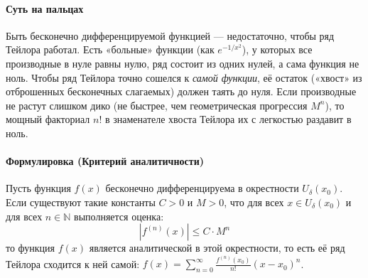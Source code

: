 \paragraph{Суть на пальцах}
Быть бесконечно дифференцируемой функцией — недостаточно, чтобы ряд Тейлора работал. Есть «больные» функции (как $e^{-1/x^2}$), у которых все производные в нуле равны нулю, ряд состоит из одних нулей, а сама функция не ноль. Чтобы ряд Тейлора точно сошелся к \textit{самой функции}, её остаток («хвост» из отброшенных бесконечных слагаемых) должен таять до нуля. Если производные не растут слишком дико (не быстрее, чем геометрическая прогрессия $M^n$), то мощный факториал $n!$ в знаменателе хвоста Тейлора их с легкостью раздавит в ноль.

\paragraph{Формулировка (Критерий аналитичности)}
Пусть функция $f(x)$ бесконечно дифференцируема в окрестности $U_{\delta}(x_0)$. Если существуют такие константы $C > 0$ и $M > 0$, что для всех $x \in U_{\delta}(x_0)$ и для всех $n \in \mathbb{N}$ выполняется оценка:
$$ |f^{(n)}(x)| \le C \cdot M^n $$
то функция $f(x)$ является аналитической в этой окрестности, то есть её ряд Тейлора сходится к ней самой: $f(x) = \sum_{n=0}^\infty \frac{f^{(n)}(x_0)}{n!} (x-x_0)^n$.

